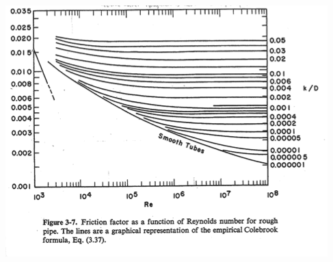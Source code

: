 \documentclass[paper=a4, fontsize=12pt]{scrartcl} %
\numberwithin{equation}{section} %
\numberwithin{figure}{section} %
\numberwithin{table}{section} %
\begin{document}
  \includegraphics[scale=0.9]{MoodyChart.png}
\end{document}
